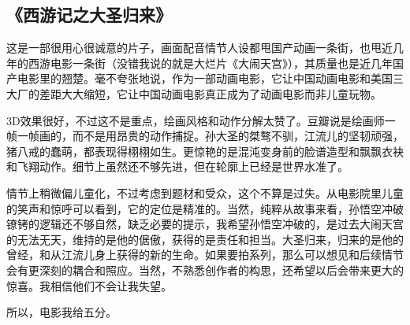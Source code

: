 \subsection{《西游记之大圣归来》}
这是一部很用心很诚意的片子，画面配音情节人设都甩国产动画一条街，也甩近几年的西游电影一条街（没错我说的就是大烂片《大闹天宫》），其质量也是近几年国产电影里的翘楚。毫不夸张地说，作为一部动画电影，它让中国动画电影和美国三大厂的差距大大缩短，它让中国动画电影真正成为了动画电影而非儿童玩物。 

3D效果很好，不过这不是重点，绘画风格和动作分解太赞了。豆瓣说是绘画师一帧一帧画的，而不是用昂贵的动作捕捉。孙大圣的桀骜不驯，江流儿的坚韧顽强，猪八戒的蠢萌，都表现得栩栩如生。更惊艳的是混沌变身前的脸谱造型和飘飘衣袂和飞翔动作。细节上虽然还不够先进，但在轮廓上已经是世界水准了。 

情节上稍微偏儿童化，不过考虑到题材和受众，这个不算是过失。从电影院里儿童的笑声和惊呼可以看到，它的定位是精准的。当然，纯粹从故事来看，孙悟空冲破镣铐的逻辑还不够自然，缺乏必要的提示，我希望孙悟空冲破的，是过去大闹天宫的无法无天，维持的是他的倨傲，获得的是责任和担当。大圣归来，归来的是他的曾经，和从江流儿身上获得的新的生命。如果要拍系列，那么可以想见和后续情节会有更深刻的耦合和照应。当然，不熟悉创作者的构思，还希望以后会带来更大的惊喜。我相信他们不会让我失望。 

所以，电影我给五分。